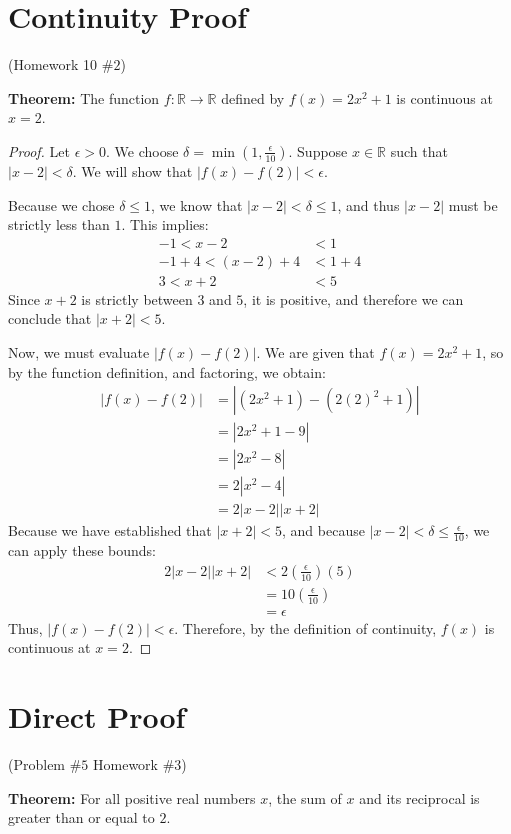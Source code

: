 \documentclass[12pt]{amsart}
\begin{document}
\section{Continuity Proof}
\begin{center}(Homework 10 $\#2$)\end{center}

\textbf{Theorem:} The function $f: \mathbb{R} \rightarrow \mathbb{R}$ defined by $f(x) = 2x^2+1$ is continuous at $x=2$.

\begin{proof}
Let $\epsilon > 0$. We choose $\delta = \min\left(1, \frac{\epsilon}{10}\right)$. Suppose $x \in \mathbb{R}$ such that $|x-2| < \delta$. We will show that $|f(x) - f(2)| < \epsilon$.

Because we chose $\delta \le 1$, we know that $|x-2| < \delta \le 1$, and thus $|x-2|$ must be strictly less than $1$. This implies:
\begin{align*}
    -1 < x - 2 &< 1 \\
    -1+4 < (x - 2)+4 &< 1 +4\\
    3 < x + 2 &< 5
\end{align*}
Since $x+2$ is strictly between $3$ and $5$, it is positive, and therefore we can conclude that $|x+2| < 5$.

Now, we must evaluate $|f(x)-f(2)|$. We are given that $f(x)=2x^2+1$, so by the function definition, and factoring, we obtain:
\begin{align*}
    |f(x) - f(2)| &= |(2x^2+1) - (2(2)^2+1)| \\
    &= |2x^2+1-9| \\
    &= |2x^2-8| \\
    &= 2|x^2-4| \\
    &= 2|x-2||x+2| 
\end{align*}
Because we have established that $|x+2| < 5$, and because $|x-2| < \delta \le \frac{\epsilon}{10}$, we can apply these bounds:
\begin{align*}
    2|x-2||x+2| &< 2 \left(\frac{\epsilon}{10}\right) (5) \\
    &= 10 \left(\frac{\epsilon}{10}\right) \\
    &= \epsilon
\end{align*}
Thus, $|f(x) - f(2)| < \epsilon$. Therefore, by the definition of continuity, $f(x)$ is continuous at $x=2$.
\end{proof}

\newpage
\section{Direct Proof}
\begin{center}(Problem $\#5$ Homework $\#3$)\end{center}
\noindent\textbf{Theorem:} For all positive real numbers $x$, the sum of $x$ and its reciprocal is greater than or equal to $2$.
\end{document}
